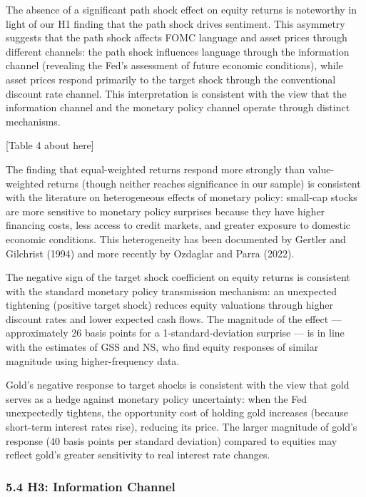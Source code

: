 \documentclass[12pt]{article}
\begin{document}
The absence of a significant path shock effect on equity returns is
noteworthy in light of our H1 finding that the path shock drives
sentiment. This asymmetry suggests that the path shock affects FOMC
language and asset prices through different channels: the path shock
influences language through the information channel (revealing the Fed's
assessment of future economic conditions), while asset prices respond
primarily to the target shock through the conventional discount rate
channel. This interpretation is consistent with the view that the
information channel and the monetary policy channel operate through
distinct mechanisms.

{[}Table 4 about here{]}

The finding that equal-weighted returns respond more strongly than
value-weighted returns (though neither reaches significance in our
sample) is consistent with the literature on heterogeneous effects of
monetary policy: small-cap stocks are more sensitive to monetary policy
surprises because they have higher financing costs, less access to
credit markets, and greater exposure to domestic economic conditions.
This heterogeneity has been documented by Gertler and Gilchrist (1994)
and more recently by Ozdaglar and Parra (2022).

The negative sign of the target shock coefficient on equity returns is
consistent with the standard monetary policy transmission mechanism: an
unexpected tightening (positive target shock) reduces equity valuations
through higher discount rates and lower expected cash flows. The
magnitude of the effect --- approximately 26 basis points for a
1-standard-deviation surprise --- is in line with the estimates of GSS
and NS, who find equity responses of similar magnitude using
higher-frequency data.

Gold's negative response to target shocks is consistent with the view
that gold serves as a hedge against monetary policy uncertainty: when
the Fed unexpectedly tightens, the opportunity cost of holding gold
increases (because short-term interest rates rise), reducing its price.
The larger magnitude of gold's response (40 basis points per standard
deviation) compared to equities may reflect gold's greater sensitivity
to real interest rate changes.

\subsubsection{5.4 H3: Information
Channel}\label{h3-information-channel}
\end{document}
